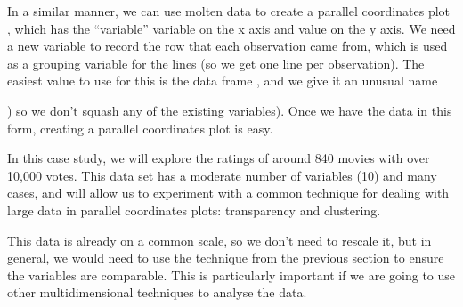 In a similar manner, we can use molten data to create a parallel coordinates plot \citep{inselberg:1985,wegman:1990}, which has the ``variable'' variable on the x axis and value on the y axis.  We need a new variable to record the row that each observation came from, which is used as a grouping variable for the lines (so we get one line per observation). The easiest value to use for this is the data frame , and we give it an unusual name {) so we don't squash any of the existing variables). Once we have the data in this form, creating a parallel coordinates plot is easy.

In this case study, we will explore the ratings of around 840 movies with over 10,000 votes.  This data set has a moderate number of variables (10) and many cases, and will allow us to experiment with a common technique for dealing with large data in parallel coordinates plots: transparency and clustering.

This data is already on a common scale, so we don't need to rescale it, but in general, we would need to use the technique from the previous section to ensure the variables are comparable.  This is particularly important if we are going to use other multidimensional techniques to analyse the data.

% 
% 


% 
% 
% 

}
